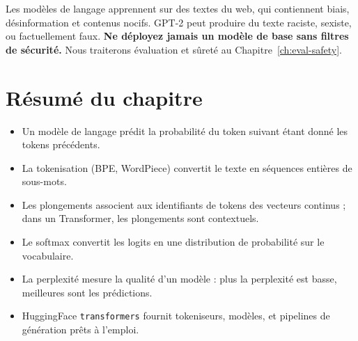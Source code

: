 \begin{ethicsbox}
Les mod\`eles de langage apprennent sur des textes du web, qui contiennent biais, d\'esinformation et contenus nocifs. GPT-2 peut produire du texte raciste, sexiste, ou factuellement faux. \textbf{Ne d\'eployez jamais un mod\`ele de base sans filtres de s\'ecurit\'e.} Nous traiterons \'evaluation et s\^uret\'e au Chapitre~\ref{ch:eval-safety}.
\end{ethicsbox}

\section{R\'esum\'e du chapitre}

\begin{itemize}
  \item Un mod\`ele de langage pr\'edit la probabilit\'e du token suivant \'etant donn\'e les tokens pr\'ec\'edents.
  \item La tokenisation (BPE, WordPiece) convertit le texte en s\'equences enti\`eres de sous-mots.
  \item Les plongements associent aux identifiants de tokens des vecteurs continus ; dans un Transformer, les plongements sont contextuels.
  \item Le softmax convertit les logits en une distribution de probabilit\'e sur le vocabulaire.
  \item La perplexit\'e mesure la qualit\'e d'un mod\`ele : plus la perplexit\'e est basse, meilleures sont les pr\'edictions.
  \item HuggingFace \texttt{transformers} fournit tokeniseurs, mod\`eles, et pipelines de g\'en\'eration pr\^ets \`a l'emploi.
\end{itemize}
